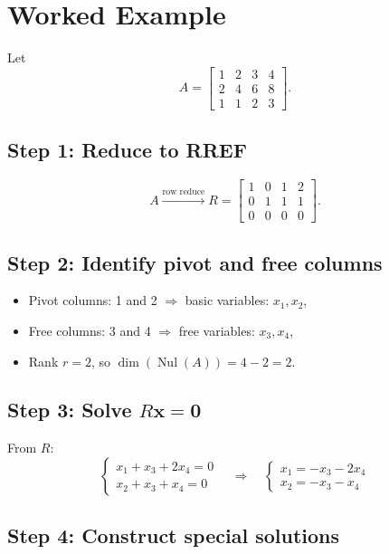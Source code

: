 \documentclass{article}
\begin{document}
\section*{Worked Example}

Let
\[
A = \begin{bmatrix}
1 & 2 & 3 & 4 \\
2 & 4 & 6 & 8 \\
1 & 1 & 2 & 3
\end{bmatrix}.
\]

\subsection*{Step 1: Reduce to RREF}
\[
A \xrightarrow{\text{row reduce}} R = \begin{bmatrix}
1 & 0 & 1 & 2 \\
0 & 1 & 1 & 1 \\
0 & 0 & 0 & 0
\end{bmatrix}.
\]

\subsection*{Step 2: Identify pivot and free columns}

\begin{itemize}
\item Pivot columns: 1 and 2 $\Rightarrow$ basic variables: $x_1, x_2$,
    \item Free columns: 3 and 4 $\Rightarrow$ free variables: $x_3, x_4$,
    \item Rank $r = 2$, so $\dim(\operatorname{Nul}(A)) = 4 - 2 = 2$.
\end{itemize}

\subsection*{Step 3: Solve $R\mathbf{x} = \mathbf{0}$}
From $R$:
\[
\begin{cases}
x_1 + x_3 + 2x_4 = 0 \\
x_2 + x_3 + x_4 = 0
\end{cases}
\quad \Rightarrow \quad
\begin{cases}
x_1 = -x_3 - 2x_4 \\
x_2 = -x_3 - x_4
\end{cases}
\]

\subsection*{Step 4: Construct special solutions}
\end{document}
